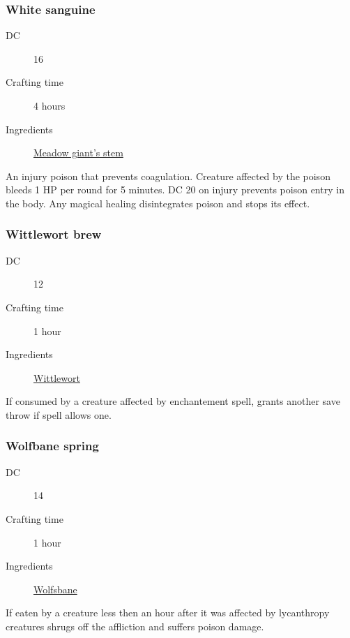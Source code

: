 \subsubsection{White sanguine}
\label{White sanguine}

\begin{description}
\item [DC] 16 \nature
\item [Crafting time] 4 hours
\item [Ingredients] \hyperref[Meadow Giant]{Meadow giant's stem}
\end{description}

An injury poison that prevents coagulation. Creature affected by the poison bleeds 
1 HP per round for 5 minutes. DC 20 \constitutionsave on injury prevents poison entry in the body. 
Any magical healing disintegrates poison and stops its effect.

\subsubsection{Wittlewort brew}
\label{Wittlewort brew}

\begin{description}
\item [DC] 12 \survival
\item [Crafting time] 1 hour
\item [Ingredients] \hyperref[Wittlewort]{Wittlewort}
\end{description}

If consumed by a creature affected by enchantement spell, grants another save throw if spell allows one.

\subsubsection{Wolfbane spring}
\label{Wolfbane spring}

\begin{description}
\item [DC] 14 \medicine
\item [Crafting time] 1 hour
\item [Ingredients] \hyperref[Wolfsbane]{Wolfsbane}
\end{description}

If eaten by a creature less then an hour after it was affected by lycanthropy creatures shrugs off 
the affliction and suffers  poison damage.
